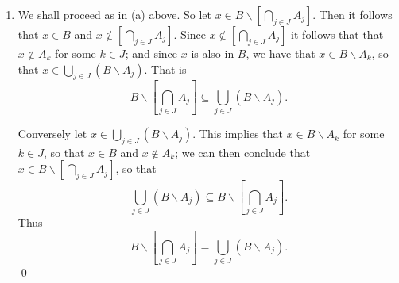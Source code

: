 \begin{enumerate}
\begin{enumerate}
               Conversely let $x \in \bigcap_{j \in J}(B{\backslash}A_j)$. This
               implies that $x \in B{\backslash}A_k$ for every $k \in J$, so
               that $x \in B$ and $x \notin A_k$ for every $k \in J$; we can
               then conclude that
               $x \in B{\backslash}\left[\bigcup_{j \in J}A_j\right]$, so that
               $$\bigcap_{j \in J}(B{\backslash}A_j) \subseteq
                 B{\backslash}{\left[\bigcup_{j \in J}A_j\right]}.$$
               Thus
               $$B{\backslash}{\left[\bigcup_{j \in J}A_j\right]} =
                 \bigcap_{j \in J}(B{\backslash}A_j).$$ \qed
         \item We shall proceed as in (a) above. So let
               $x \in B{\backslash}\left[\bigcap_{j \in J}A_j\right]$. Then it 
               follows that $x \in B$ and
               $x \notin \left[\bigcap_{j \in J}A_j\right]$. Since
               $x \notin \left[\bigcap_{j \in J}A_j\right]$ it follows that
               that $x \notin A_k$ for some $k \in J$; and since $x$ is also in 
               $B$, we have that $x \in B{\backslash}A_k$, so that
               $x \in \bigcup_{j \in J}(B{\backslash}A_j)$. That is
               $$B{\backslash}{\left[\bigcap_{j \in J}A_j\right]} \subseteq
                 \bigcup_{j \in J}(B{\backslash}A_j).$$

               Conversely let $x \in \bigcup_{j \in J}(B{\backslash}A_j)$. This
               implies that $x \in B{\backslash}A_k$ for some $k \in J$, so
               that $x \in B$ and $x \notin A_k$; we can
               then conclude that
               $x \in B{\backslash}\left[\bigcap_{j \in J}A_j\right]$, so that
               $$\bigcup_{j \in J}(B{\backslash}A_j) \subseteq
                 B{\backslash}{\left[\bigcap_{j \in J}A_j\right]}.$$
               Thus
               $$B{\backslash}{\left[\bigcap_{j \in J}A_j\right]} =
                 \bigcup_{j \in J}(B{\backslash}A_j).$$ \qed
      \end{enumerate}
\end{enumerate}
